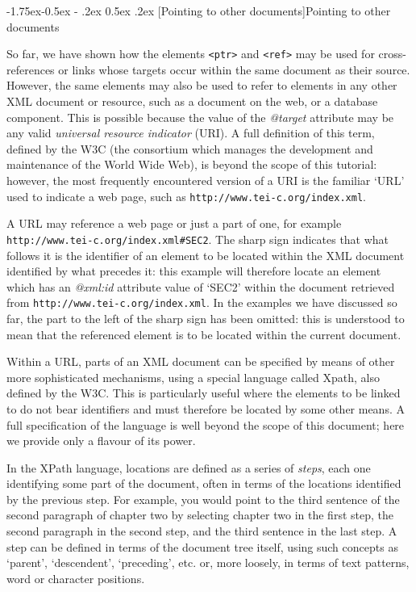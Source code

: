 \documentclass[11pt,twoside]{article}\makeatletter
\makeatletter
\renewcommand\subsection{\@startsection{subsection}{2}{\z@}%
     {-1.75ex\@plus -0.5ex \@minus- .2ex}%
     {0.5ex \@plus .2ex}%
     {\reset@font\Large\sffamily}}
\makeatother
\begin{document}
\subsection[{Pointing to other documents}]{Pointing to other documents}\label{xptrs}\par
So far, we have shown how the elements \texttt{<ptr>} and \texttt{<ref>} may be used for cross-references or links whose targets occur within the same document as their source. However, the same elements may also be used to refer to elements in any other XML document or resource, such as a document on the web, or a database component. This is possible because the value of the \textit{@target} attribute may be any valid \textit{universal resource indicator} (URI). A full definition of this term, defined by the W3C (the consortium which manages the development and maintenance of the World Wide Web), is beyond the scope of this tutorial: however, the most frequently encountered version of a URI is the familiar ‘URL’ used to indicate a web page, such as \texttt{http://www.tei-c.org/index.xml}.\par
A URL may reference a web page or just a part of one, for example \texttt{http://www.tei-c.org/index.xml\#SEC2}. The sharp sign indicates that what follows it is the identifier of an element to be located within the XML document identified by what precedes it: this example will therefore locate an element which has an \textit{@xml:id} attribute value of ‘SEC2’ within the document retrieved from \texttt{http://www.tei-c.org/index.xml}. In the examples we have discussed so far, the part to the left of the sharp sign has been omitted: this is understood to mean that the referenced element is to be located within the current document.\par
Within a URL, parts of an XML document can be specified by means of other more sophisticated mechanisms, using a special language called Xpath, also defined by the W3C. This is particularly useful where the elements to be linked to do not bear identifiers and must therefore be located by some other means. A full specification of the language is well beyond the scope of this document; here we provide only a flavour of its power. \par
In the XPath language, locations are defined as a series of \textit{steps}, each one identifying some part of the document, often in terms of the locations identified by the previous step. For example, you would point to the third sentence of the second paragraph of chapter two by selecting chapter two in the first step, the second paragraph in the second step, and the third sentence in the last step. A step can be defined in terms of the document tree itself, using such concepts as ‘parent’, ‘descendent’, ‘preceding’, etc. or, more loosely, in terms of text patterns, word or character positions.
\end{document}
